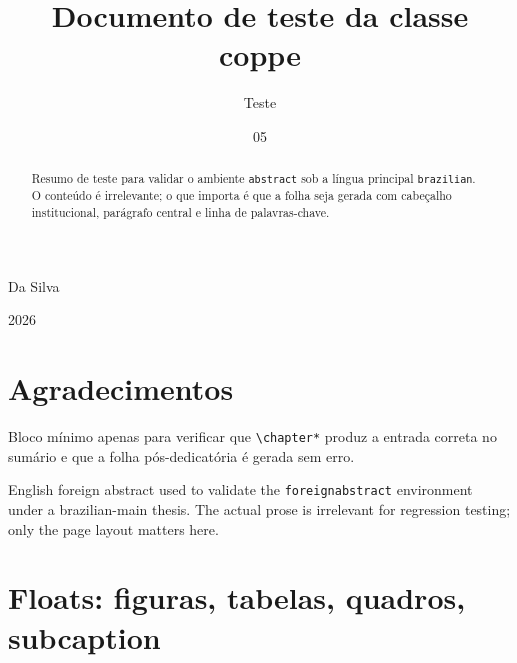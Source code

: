 \documentclass[dsc]{ufrj}
\begin{document}
  \title{Documento de teste da classe coppe}
  \author{Teste}{Da Silva}
  \date{05}{2026}


  \maketitle

  \frontmatter
  \dedication{Dedico a quem tiver de depurar esta classe.}

  \chapter*{Agradecimentos}
  Bloco mínimo apenas para verificar que \verb|\chapter*| produz a entrada
  correta no sumário e que a folha pós-dedicatória é gerada sem erro.

  \begin{abstract}
  Resumo de teste para validar o ambiente \texttt{abstract} sob a língua
  principal \texttt{brazilian}. O conteúdo é irrelevante; o que importa
  é que a folha seja gerada com cabeçalho institucional, parágrafo
  central e linha de palavras-chave.
  \end{abstract}

  \begin{foreignabstract}
  English foreign abstract used to validate the \texttt{foreignabstract}
  environment under a brazilian-main thesis. The actual prose is irrelevant
  for regression testing; only the page layout matters here.
  \end{foreignabstract}

  \listoffigures
  \listofquadros
  \listofprogramas
  \listoftables
  \printloabbreviations
  \printlosymbols
  \tableofcontents

  \mainmatter

  \chapter{Floats: figuras, tabelas, quadros, subcaption}
  \label{cap:floats}
\end{document}
